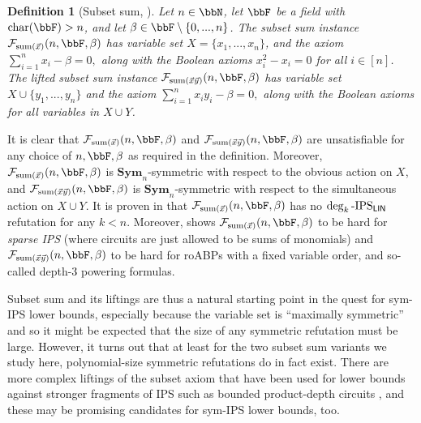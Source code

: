 \documentclass[10pt,a4paper]{article}
\newtheorem{definition}[theorem]{Definition}
\newcommand{\Sym}{{\mathbf{Sym}}}
\newcommand{\Ff}{{\cal F}}
\newcommand{\IPSlin}{\text{\upshape IPS}_{\mathsf{LIN}}}
\begin{document}
\begin{definition}[Subset sum, \cite{lowerbounds_IPS}]
	Let $n \in \bbN$, let $\bbF$ be a field with $\text{char}(\bbF) > n$, and let $\beta \in \bbF \setminus \{0,...,n\}$. The \emph{subset sum} instance $\Ff_{\text{sum}(\vec x)}(n,\bbF,\beta)$ has variable set
	$X = \{x_1,...,x_n\}$, and the axiom
	$
	\sum_{i=1}^n x_i - \beta = 0,
	$
	along with the Boolean axioms $x_i^2 - x_i = 0$ for all $i \in [n]$.
	The \emph{lifted subset sum} instance $\Ff_{\text{sum}(\vec x\vec y)}(n,\bbF,\beta)$ has variable set $X \cup \{y_1,...,y_n\}$ and the axiom 	$
	\sum_{i=1}^n x_iy_i- \beta = 0,
	$
	along with the Boolean axioms for all variables in $X \cup Y$.
\end{definition}	
It is clear that $\Ff_{\text{sum}(\vec x)}(n,\bbF,\beta)$ and $\Ff_{\text{sum}(\vec x \vec y)}(n,\bbF,\beta)$ are unsatisfiable for any choice of $n, \bbF, \beta$ as required in the definition. Moreover, $\Ff_{\text{sum}(\vec x)}(n,\bbF,\beta)$ is $\Sym_n$-symmetric with respect to the obvious action on $X$, and $\Ff_{\text{sum}(\vec x\vec y)}(n,\bbF,\beta)$ is $\Sym_n$-symmetric with respect to the simultaneous action on $X \cup Y$.
It is proven in \cite[Proposition 5.3]{lowerbounds_IPS} that $\Ff_{\text{sum}(\vec x)}(n,\bbF,\beta)$ has no $\deg_k\text{-}\IPSlin$ refutation for any $k < n$.
Moreover, \cite{lowerbounds_IPS} shows $\Ff_{\text{sum}(\vec x)}(n,\bbF,\beta)$ to be hard for \emph{sparse IPS} (where circuits are just allowed to be sums of monomials) and $\Ff_{\text{sum}(\vec x \vec y)}(n,\bbF,\beta)$ to be hard for roABPs with a fixed variable order, and so-called depth-3 powering formulas.


Subset sum and its liftings are thus a natural starting point in the quest for sym-IPS lower bounds, especially because the variable set is ``maximally symmetric'' and so it might be expected that the size of any symmetric refutation must be large. However, it turns out that at least for the two subset sum variants we study here, polynomial-size symmetric refutations do in fact exist. 
There are more complex liftings of the subset axiom that have been used for lower bounds against stronger fragments of IPS such as bounded product-depth circuits
\cite{govindasamy2022simple, hakoniemi2024functional}, and these may be promising candidates for sym-IPS lower bounds, too.
\end{document}
